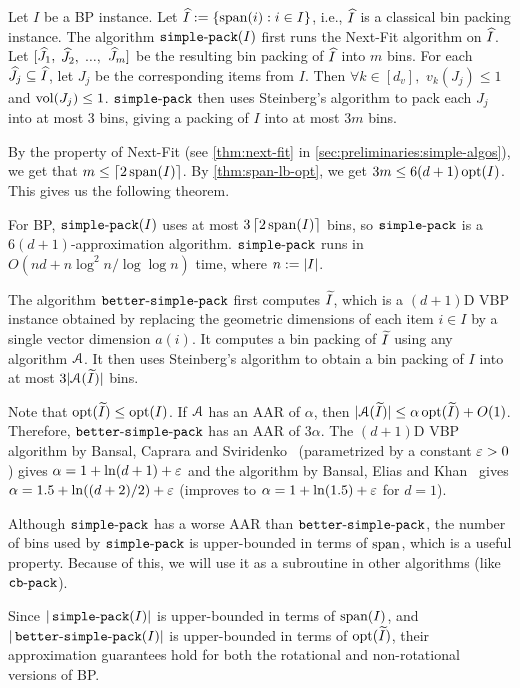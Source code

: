 Let $I$ be a  BP instance.
Let $\widehat{I} := \{\operatorname{span}(i): i \in I\}$, i.e., $\widehat{I}$ is a classical bin packing instance.
The algorithm $\operatorname{\mathtt{simple-pack}}(I)$ first runs the Next-Fit algorithm on $\widehat{I}$.
Let $[\widehat{J}_1,$ $\widehat{J}_2,$ $\ldots,$ $\widehat{J}_m]$
be the resulting bin packing of $\widehat{I}$ into $m$ bins.
For each $\widehat{J}_j \subseteq \widehat{I}$, let $J_j$ be the corresponding items from $I$.
Then $\forall k \in [d_v],$ $v_k(J_j) \le 1$ and $\operatorname{vol}(J_j) \le 1$.
$\operatorname{\mathtt{simple-pack}}$ then uses Steinberg's algorithm to pack each $J_j$ into at most 3 bins,
giving a packing of $I$ into at most $3m$ bins.

By the property of Next-Fit (see \cref{thm:next-fit} in \cref{sec:preliminaries:simple-algos}),
we get that $m \le \left\lceil 2\operatorname{span}(I) \right\rceil$.
By \cref{thm:span-lb-opt}, we get $3m \le 6(d+1)\operatorname{opt}(I)$.
This gives us the following theorem.
\begin{theorem}
\label{thm:span-pack}
For  BP, $\operatorname{\mathtt{simple-pack}}(I)$ uses at most $3\left\lceil 2\operatorname{span}(I) \right\rceil$ bins,
so $\operatorname{\mathtt{simple-pack}}$ is a $6(d+1)$-approximation algorithm.
$\operatorname{\mathtt{simple-pack}}$ runs in $O(nd + n\log^2 n/\log\log n)$ time,
where $n := |I|$.
\end{theorem}

The algorithm $\operatorname{\mathtt{better-simple-pack}}$ first computes $\widetilde{I}$,
which is a $(d+1)$D VBP instance obtained by
replacing the geometric dimensions of each item $i \in I$ by a single vector dimension $a(i)$.
It computes a bin packing of $\widetilde{I}$ using any algorithm $\mathcal{A}$.
It then uses Steinberg's algorithm to obtain a bin packing
of $I$ into at most $3|\mathcal{A}(\widetilde{I})|$ bins.

Note that $\operatorname{opt}(\widetilde{I}) \le \operatorname{opt}(I)$.
If $\mathcal{A}$ has an AAR of $\alpha$, then $|\mathcal{A}(\widetilde{I})| \le \alpha\operatorname{opt}(\widetilde{I}) + O(1)$.
Therefore, $\operatorname{\mathtt{better-simple-pack}}$ has an AAR of $3\alpha$.
The $(d+1)$D VBP algorithm by Bansal, Caprara and Sviridenko~\cite{rna}
(parametrized by a constant $\varepsilon > 0$) gives $\alpha = 1+\ln(d+1)+\varepsilon$
and the algorithm by Bansal, Elias and Khan~\cite{bansal2016improved} gives
$\alpha = 1.5+\ln((d+2)/2)+\varepsilon$ (improves to $\alpha = 1+\ln(1.5)+\varepsilon$ for $d=1$).

Although $\operatorname{\mathtt{simple-pack}}$ has a worse AAR than $\operatorname{\mathtt{better-simple-pack}}$,
the number of bins used by $\operatorname{\mathtt{simple-pack}}$ is upper-bounded in terms of $\operatorname{span}$,
which is a useful property. Because of this,
we will use it as a subroutine in other algorithms (like $\operatorname{\mathtt{cb-pack}}$).

Since $|\operatorname{\mathtt{simple-pack}}(I)|$ is upper-bounded in terms of $\operatorname{span}(I)$,
and $|\operatorname{\mathtt{better-simple-pack}}(I)|$ is upper-bounded in terms of $\operatorname{opt}(\widetilde{I})$,
their approximation guarantees hold for both the
rotational and non-rotational versions of  BP.

